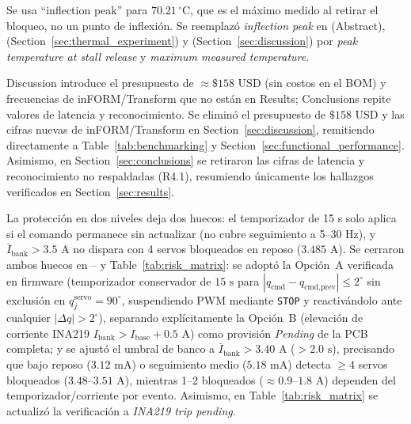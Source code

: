 \documentclass{LabDSTresponse}
\begin{document}
{Se usa “inflection peak” para $70.21\,^\circ\text{C}$, que es el máximo medido al retirar el bloqueo, no un punto de inflexión.}
{Se reemplazó \textit{inflection peak} en  (Abstract),  (Section~\ref{sec:thermal_experiment}) y  (Section~\ref{sec:discussion}) por \textit{peak temperature at stall release} y \textit{maximum measured temperature}.}

{Discussion introduce el presupuesto de $\approx \$158\text{ USD}$ (sin costos en el BOM) y frecuencias de inFORM/Transform que no están en Results; Conclusions repite valores de latencia y reconocimiento.}
{Se eliminó el presupuesto de $\$158\text{ USD}$ y las cifras nuevas de inFORM/Transform en Section~\ref{sec:discussion}, remitiendo directamente a Table~\ref{tab:benchmarking} y Section~\ref{sec:functional_performance}. Asimismo, en Section~\ref{sec:conclusions} se retiraron las cifras de latencia y reconocimiento no respaldadas (R4.1), resumiendo únicamente los hallazgos verificados en Section~\ref{sec:results}.}


{La protección en dos niveles deja dos huecos: el temporizador de 15 s solo aplica si el comando permanece sin actualizar (no cubre seguimiento a 5--30 Hz), y $\bar{I}_{\text{bank}} > 3.5\text{ A}$ no dispara con 4 servos bloqueados en reposo ($3.485\text{ A}$).}
{Se cerraron ambos huecos en -- y Table~\ref{tab:risk_matrix}: se adoptó la Opción~A verificada en firmware (temporizador conservador de $15\text{ s}$ para $|q_{\text{cmd}} - q_{\text{cmd,prev}}| \le 2^\circ$ sin exclusión en $q_j^{\text{servo}} = 90^\circ$, suspendiendo PWM mediante \texttt{STOP} y reactivándolo ante cualquier $|\Delta q| > 2^\circ$), separando explícitamente la Opción~B (elevación de corriente INA219 $I_{\text{bank}} > I_{\text{base}} + 0.5\text{ A}$) como provisión \textit{Pending} de la PCB completa; y se ajustó el umbral de banco a $\bar{I}_{\text{bank}} > 3.40\text{ A}$ ($>2.0\text{ s}$), precisando que bajo reposo ($3.12\text{ mA}$) o seguimiento medio ($5.18\text{ mA}$) detecta $\ge 4$ servos bloqueados ($3.48\text{--}3.51\text{ A}$), mientras 1--2 bloqueados ($\approx 0.9\text{--}1.8\text{ A}$) dependen del temporizador/corriente por evento. Asimismo, en Table~\ref{tab:risk_matrix} se actualizó la verificación a \textit{INA219 trip pending}.}
\end{document}
